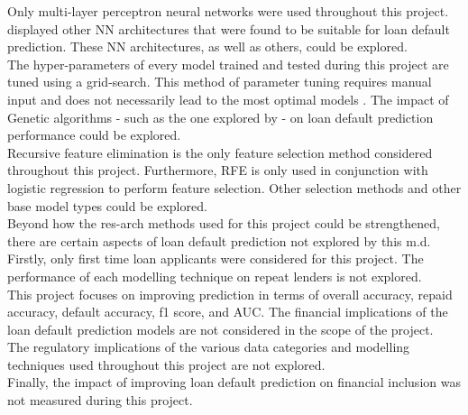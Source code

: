 Only multi-layer perceptron neural networks were used throughout this project. \textcite{NNWest} displayed other NN architectures that were found to be suitable for loan default prediction. These NN architectures, as well as others, could be explored. \\

The hyper-parameters of every model trained and tested during this project are tuned using a grid-search. This method of parameter tuning requires manual input and does not necessarily lead to the most optimal models \parencite{NNWest}. The impact of Genetic algorithms - such as the one explored by \textcite{NNShen} - on loan default prediction performance could be explored. \\

Recursive feature elimination is the only feature selection method considered throughout this project. Furthermore, RFE is only used in conjunction with logistic regression to perform feature selection. Other selection methods and other base model types could be explored. \\  

Beyond how the res-arch methods used for this project could be strengthened, there are certain aspects of loan default prediction not explored by this m.d. Firstly, only first time loan applicants were considered for this project. The performance of each modelling technique on repeat lenders is not explored. \\

This project focuses on improving prediction in terms of overall accuracy, repaid accuracy, default accuracy, f1 score, and AUC. The financial implications of the loan default prediction models are not considered in the scope of the project. \\

The regulatory implications of the various data categories and modelling techniques used throughout this project are not explored. \\

Finally, the impact of improving loan default prediction on financial inclusion was not measured during this project. 
